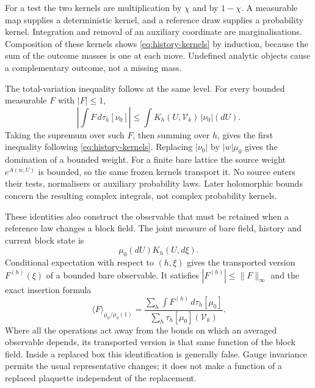 \documentclass[11pt,letterpaper,reqno]{amsart}
\theoremstyle{definition}
\theoremstyle{remark}
\begin{document}
For a test the two kernels are multiplication by $\chi$
and by $1-\chi$. A measurable map supplies a deterministic
kernel, and a reference draw supplies a probability kernel.
Integration and removal of an auxiliary coordinate are
marginalisations. Composition of these kernels shows
\eqref{eq:history-kernels} by induction, because the sum of
the outcome masses is one at each move. Undefined analytic
objects cause a complementary outcome, not a missing mass.

The total-variation inequality follows at the same level.
For every bounded measurable $F$ with $|F|\le1$,
\[
 \left|\int F\,d\tau_h[\nu_0]\right|
 \le\int K_h(U,\mathcal V_k)\,|\nu_0|(dU).
\]
Taking the supremum over such $F$, then summing over $h$,
gives the first inequality following
\eqref{eq:history-kernels}. Replacing $|\nu_0|$ by
$|w|\mu_0$ gives the domination of a bounded weight.
For a finite bare lattice the source weight $e^{A(w,U)}$
is bounded, so the same frozen kernels transport it.
No source enters their tests, normalisers or auxiliary
probability laws. Later holomorphic bounds concern the
resulting complex integrals, not complex probability
kernels.

These identities also construct the observable that must
be retained when a reference law changes a block field.
The joint measure of bare field, history and current
block state is
\[
 \mu_0(dU)K_h(U,d\xi).
\]
Conditional expectation with respect to $(h,\xi)$ gives
the transported version $F^{(h)}(\xi)$ of a bounded bare
observable. It satisfies $|F^{(h)}|\le\|F\|_\infty$
and the exact insertion formula
\begin{equation}\label{eq:mrg-history-insertion}
 \langle F\rangle_{\mu_0/\mu_0(1)}
   =\frac{\sum_h\int F^{(h)}\,d\tau_h[\mu_0]}
          {\sum_h\tau_h[\mu_0](\mathcal V_k)}.
\end{equation}
Where all the operations act away from the bonds on which
an averaged observable depends, its transported version
is that same function of the block field. Inside a
replaced box this identification is generally false.
Gauge invariance permits the usual representative changes;
it does not make a function of a replaced plaquette
independent of the replacement.
\end{document}
